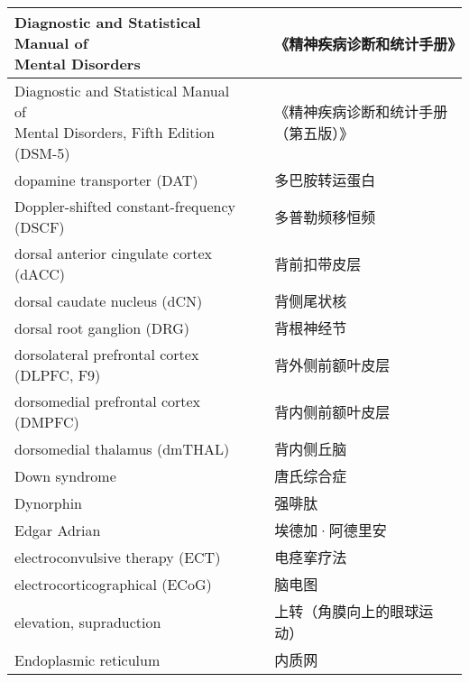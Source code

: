 \begin{longtable}{lll}
	\midrule
	\makecell{Diagnostic and Statistical Manual of \\Mental Disorders}     &&  《精神疾病诊断和统计手册》  \\
	
	\midrule
	\makecell{Diagnostic and Statistical Manual of \\Mental Disorders, Fifth Edition (DSM-5)}     &&  《精神疾病诊断和统计手册（第五版）》  \\
	
	\midrule
	dopamine transporter (DAT)     &&  多巴胺转运蛋白  \\
	
	\midrule
	Doppler-shifted constant-frequency (DSCF)     &&  多普勒频移恒频  \\
	
	\midrule
	dorsal anterior cingulate cortex (dACC)     &&  背前扣带皮层  \\
	
	\midrule
	dorsal caudate nucleus (dCN)     &&  背侧尾状核  \\
	
	\midrule
	dorsal root ganglion (DRG)     &&  背根神经节  \\
	
	\midrule
	dorsolateral prefrontal cortex (DLPFC, F9)     &&  背外侧前额叶皮层  \\
	
	\midrule
	dorsomedial prefrontal cortex (DMPFC)     &&  背内侧前额叶皮层  \\
	
	\midrule
	dorsomedial thalamus (dmTHAL)     &&  背内侧丘脑  \\
	
	\midrule
	Down syndrome     &&  唐氏综合症  \\
	
	\midrule
	Dynorphin     &&  强啡肽  \\
	
	\midrule
	Edgar Adrian     &&  埃德加·阿德里安  \\
	
	\midrule
	electroconvulsive therapy (ECT)     &&  电痉挛疗法  \\
	
	\midrule
	electrocorticographical (ECoG)     &&  脑电图  \\
	
	\midrule
	elevation, supraduction     &&  上转（角膜向上的眼球运动）  \\
	
	\midrule
	Endoplasmic reticulum     &&  内质网  \\
	

\end{longtable}
